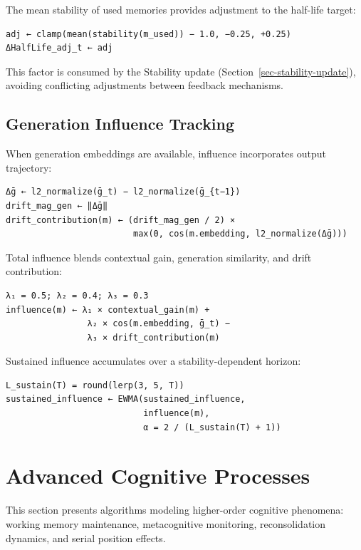 \documentclass[
  letterpaper,
  DIV=11,
  numbers=noendperiod]{scrartcl}
\begin{document}
The mean stability of used memories provides adjustment to the half-life
target:

\begin{verbatim}
adj ← clamp(mean(stability(m_used)) − 1.0, −0.25, +0.25)
ΔHalfLife_adj_t ← adj
\end{verbatim}

This factor is consumed by the Stability update
(Section~\ref{sec-stability-update}), avoiding conflicting adjustments
between feedback mechanisms.

\subsection{Generation Influence
Tracking}\label{generation-influence-tracking}

When generation embeddings are available, influence incorporates output
trajectory:

\begin{verbatim}
Δḡ ← l2_normalize(ḡ_t) − l2_normalize(ḡ_{t−1})
drift_mag_gen ← ‖Δḡ‖
drift_contribution(m) ← (drift_mag_gen / 2) ×
                         max(0, cos(m.embedding, l2_normalize(Δḡ)))
\end{verbatim}

Total influence blends contextual gain, generation similarity, and drift
contribution:

\begin{verbatim}
λ₁ = 0.5; λ₂ = 0.4; λ₃ = 0.3
influence(m) ← λ₁ × contextual_gain(m) +
                λ₂ × cos(m.embedding, ḡ_t) −
                λ₃ × drift_contribution(m)
\end{verbatim}

Sustained influence accumulates over a stability-dependent horizon:

\begin{verbatim}
L_sustain(T) = round(lerp(3, 5, T))
sustained_influence ← EWMA(sustained_influence,
                           influence(m),
                           α = 2 / (L_sustain(T) + 1))
\end{verbatim}

\section{Advanced Cognitive Processes}\label{sec-advanced}

This section presents algorithms modeling higher-order cognitive
phenomena: working memory maintenance, metacognitive monitoring,
reconsolidation dynamics, and serial position effects.
\end{document}
